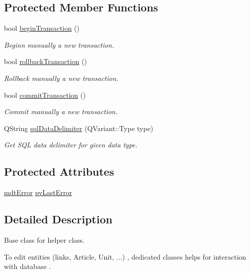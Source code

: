\subsection*{Protected Member Functions}
\begin{DoxyCompactItemize}
\item 
bool \hyperlink{classmdt_tt_base_a733fc8720c9eeabd3395883ba5a544ce}{begin\-Transaction} ()
\begin{DoxyCompactList}\small\item\em Beginn manually a new transaction. \end{DoxyCompactList}\item 
bool \hyperlink{classmdt_tt_base_a7c736836397a8d65a28992e1a39c1be5}{rollback\-Transaction} ()
\begin{DoxyCompactList}\small\item\em Rollback manually a new transaction. \end{DoxyCompactList}\item 
bool \hyperlink{classmdt_tt_base_a32b6cbd2d6c9a055cbc97136e9958d81}{commit\-Transaction} ()
\begin{DoxyCompactList}\small\item\em Commit manually a new transaction. \end{DoxyCompactList}\item 
Q\-String \hyperlink{classmdt_tt_base_ad6eed5cb4ab7403ce257a4bd6e0428c8}{sql\-Data\-Delimiter} (Q\-Variant\-::\-Type type)
\begin{DoxyCompactList}\small\item\em Get S\-Q\-L data delimiter for given data type. \end{DoxyCompactList}\end{DoxyCompactItemize}
\subsection*{Protected Attributes}
\begin{DoxyCompactItemize}
\item 
\hyperlink{classmdt_error}{mdt\-Error} \hyperlink{classmdt_tt_base_aaa2bcddcfcecd1642ac24a218bccfbc7}{pv\-Last\-Error}
\end{DoxyCompactItemize}


\subsection{Detailed Description}
Base class for helper class. 

To edit entities (links, Article, Unit, ...) , dedicated classes helps for interaction with database .

